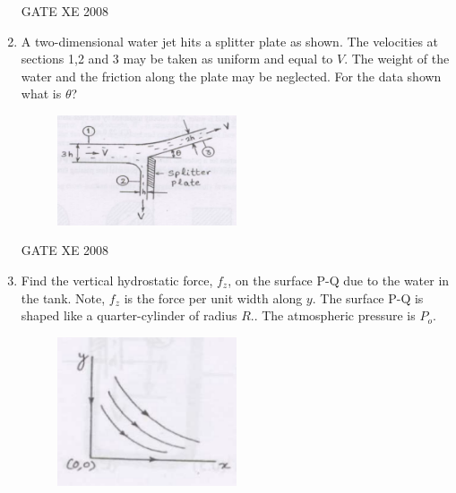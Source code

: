 \documentclass[12pt]{article}
\begin{document}
\begin{enumerate}[label=Q\arabic*.]
GATE XE 2008
\item A two-dimensional water jet hits a splitter plate as shown. The velocities at sections 1,2 and 3 may be taken as uniform and equal to $V$. The weight of the water and the friction along the plate may be neglected. For the data shown what is $\theta$?

\begin{figure}[H]
\centering
  \includegraphics[width=0.5\textwidth]{figs/ass1_d_q15.png}
  \caption{}
\end{figure} 

\begin{enumerate}[label=(\Alph*)]
\end{enumerate}

GATE XE 2008
\item Find the vertical hydrostatic force, $f_{z}$, on the surface P-Q due to the water in the tank. Note, $f_{z}$ is the force per unit width along $y$. The surface P-Q is shaped like a quarter-cylinder of radius $R$.. The atmospheric pressure is $P_{o}$.

\begin{figure}[H]
\centering
  \includegraphics[width=0.5\textwidth]{figs/ass1_d_q12.png}
  \caption{}
\end{figure} 


\end{enumerate}
\end{document}
